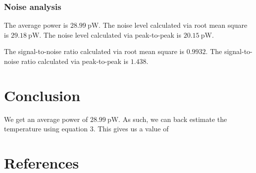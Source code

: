 \documentclass[english,12pt,a4paper]{article}
\begin{document}
 

\hypertarget{noise-analysis}{%
	\subsubsection{Noise analysis}\label{noise-analysis_7}}


	The average power is $\qty{28.99}{\pico\watt}$.
	The noise level calculated via root mean square is $\qty{29.18}{\pico\watt}$.
	The noise level calculated via peak-to-peak is $\qty{20.15}{\pico\watt}$.
	
	The signal-to-noise ratio calculated via root mean square is $0.9932$.
	The signal-to-noise ratio calculated via peak-to-peak is $1.438$.

\section{Conclusion}
We get an average power of  $\qty{28.99}{\pico\watt}$. As such, we can back estimate the temperature using equation $3$.  This gives us a value of 
\section{References}
\printbibliography
\end{document}
